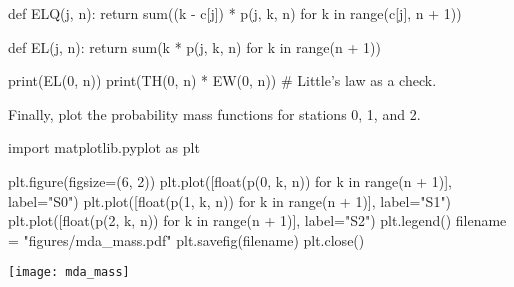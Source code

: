 \begin{exercise}
\begin{solution}
\begin{pyconsole}
def ELQ(j, n):
 return sum((k - c[j]) * p(j, k, n) for k in range(c[j], n + 1))


def EL(j, n):
 return sum(k * p(j, k, n) for k in range(n + 1))

print(EL(0, n))
print(TH(0, n) * EW(0, n)) # Little's law as a check.
 
\end{pyconsole}

Finally, plot the probability mass functions for stations 0, 1, and 2.

 
\begin{pyconsole}
import matplotlib.pyplot as plt

plt.figure(figsize=(6, 2))
plt.plot([float(p(0, k, n)) for k in range(n + 1)], label="S0")
plt.plot([float(p(1, k, n)) for k in range(n + 1)], label="S1")
plt.plot([float(p(2, k, n)) for k in range(n + 1)], label="S2")
plt.legend()
filename = "figures/mda_mass.pdf"
plt.savefig(filename)
plt.close()
 
\end{pyconsole}

\texttt{[image: mda\_mass]}

\end{solution}
\end{exercise}






